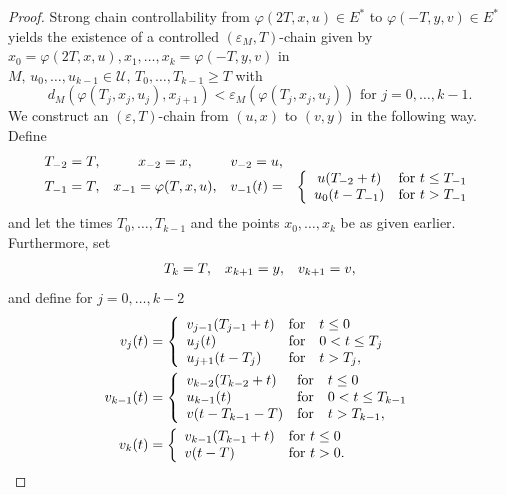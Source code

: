 \documentclass[preprint,12pt]{elsarticle}
\begin{document}
\begin{proof}
Strong chain controllability from $\varphi(2T,x,u)\in E^{\ast}$ to
$\varphi(-T,y,v)\in E^{\ast}$ yields the existence of a controlled
$(\varepsilon_{M},T)$-chain given by $x_{0}=\varphi(2T,x,u),x_{1},\ldots
,x_{k}=\varphi(-T,y,v)$ in $M,\,u_{0},\ldots,u_{k-1}\in\mathcal{U}%
,\,T_{0},\ldots,T_{k-1}\geq T$ with
\begin{equation}
d_{M}(\varphi(T_{j},x_{j},u_{j}),x_{j+1})<\varepsilon_{M}(\varphi(T_{j}%
,x_{j},u_{j}))\text{\ for }j=0,\ldots,k-1. \label{r1}%
\end{equation}
We construct an $(\varepsilon,T)$-chain from $(u,x)$ to $(v,y)$ in the
following way. Define
\[%
\begin{array}
[c]{cccc}%
T_{-2}=T, & x_{-2}=x, & v_{-2}=u, & \\
T_{-1}=T, & x_{-1}=\varphi(T,x,u), & v_{-1}(t)= & \left\{
\begin{array}
[c]{cc}%
u(T_{-2}+t) & \text{for }t\leq T_{-1}\\
u_{0}(t-T_{-1}) & \text{for }t>T_{-1}%
\end{array}
\right.
\end{array}
\]
and let the times $T_{0},\ldots,T_{k-1}$ and the points $x_{0},\ldots,x_{k}$
be as given earlier. Furthermore, set
\[%
\begin{array}
[c]{ccc}%
T_{k}=T, & x_{k+1}=y, & v_{k+1}=v,
\end{array}
\]
and define for $j=0,\ldots,k-2$%
\begin{align*}
v_{j}(t)  &  =\left\{
\begin{array}
[c]{lll}%
v_{j-1}(T_{j-1}+t) & \text{for} & t\leq0\\
u_{j}(t) & \text{for} & 0<t\leq T_{j}\\
u_{j+1}(t-T_{j}) & \text{for} & t>T_{j},
\end{array}
\right. \\
v_{k-1}(t)  &  =\left\{
\begin{array}
[c]{lll}%
v_{k-2}(T_{k-2}+t) & \text{for} & t\leq0\\
u_{k-1}(t) & \text{for} & 0<t\leq T_{k-1}\\
v(t-T_{k-1}-T) & \text{for} & t>T_{k-1},
\end{array}
\right. \\
v_{k}(t)  &  =\left\{
\begin{array}
[c]{ll}%
v_{k-1}(T_{k-1}+t) & \text{for }t\leq0\\
v(t-T) & \text{for }t>0.
\end{array}
\right.
\end{align*}

\end{proof}
\end{document}
